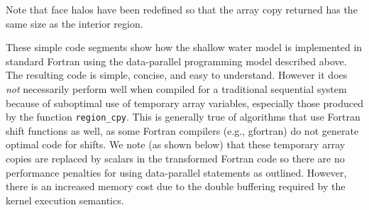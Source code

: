 \noindent
Note that face halos have been redefined so that the array copy
returned has the same size as the interior region.

These simple code segments show how the shallow water model is implemented in
standard Fortran using the data-parallel programming model described above.  The
resulting code is simple, concise, and easy to understand.  However it does
\emph{not} necessarily perform well when compiled for a traditional sequential
system because of suboptimal use of temporary array variables,
especially those produced by the function {\tt region\_cpy}.  This is generally true
of algorithms that use Fortran shift functions as well, as some Fortran
compilers (e.g., gfortran) do not generate optimal code for shifts.  We note (as
shown below) that these temporary array copies are replaced by scalars in the
transformed Fortran code so there are no performance penalties for using
data-parallel statements as outlined.  However, there is an increased memory
cost due to the double buffering required by the kernel execution semantics.
